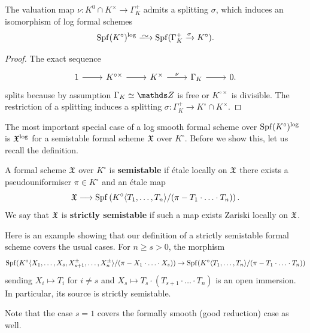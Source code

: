\begin{lem} \label{lem:spf-Kcirc-satisfies364}
    The valuation map $\nu \colon K^0 \cap K^\times \to \Gamma_K^+$ admits a splitting $\sigma$, which induces an isomorphism of log formal schemes
    \[
    \Spf(K^\circ)^{\log} \isomto \Spf(\Gamma_K^+ \xrightarrow{\sigma} K^\circ).
    \]
\end{lem}
\begin{proof} 
    The exact sequence 
    \[
        \begin{tikzcd}
            1 \ar[r] & K^{\circ\times} \ar[r] & K^\times \ar[r,"\nu"] & \Gamma_K\ar[r] & 0.
        \end{tikzcd}
    \]
   splits because by assumption $\Gamma_K \simeq \bZ$ is free or $K^{\circ \times}$ is divisible. The restriction of a splitting induces a splitting $\sigma \colon \Gamma_K^+ \to K^\circ \cap K^\times$. 
\end{proof}


The most important special case of a log smooth formal scheme over $\operatorname{Spf}(K^\circ)^{\rm log}$ is ${\mathfrak{X}}^{\rm log}$ for a semistable formal scheme ${\mathfrak{X}}$ over $K^\circ$. Before we show this, let us recall the definition. 

\begin{defi} \label{def:ss-formal-sch}
    A formal scheme ${\mathfrak{X}}$ over $K^\circ$ is {\bf semistable} if \'etale locally on ${\mathfrak{X}}$ there exists a pseudouniformiser $\pi\in K^\circ$ and an \'etale map
    \[
        {\mathfrak{X}} \longrightarrow \operatorname{Spf}\left( K^\circ\langle T_1,\dots, T_n\rangle/(\pi - T_1\cdot\ldots\cdot T_n) \right).
    \]
    We say that ${\mathfrak{X}}$ is {\bf strictly semistable} if such a map exists Zariski locally on ${\mathfrak{X}}$. 
\end{defi}

\begin{ex} \label{ex:standard-log-structure-Kcirc}
    Here is an example showing that our definition of a strictly semistable formal scheme covers the usual cases. For $n \geq s > 0$, the morphism
    \[
    \operatorname{Spf}(K^\circ\langle X_1,\ldots, X_s, X_{s+1}^\pm, \ldots, X_n^\pm\rangle/(\pi - X_1 \cdot \ldots \cdot X_s)) \to \operatorname{Spf}( K^\circ\langle T_1,\dots, T_n\rangle/(\pi - T_1\cdot\ldots\cdot T_n))
    \]
    sending $X_i \mapsto T_i$ for $i \not= s$ and $X_s \mapsto T_s \cdot(T_{s+1} \cdot \ldots \cdot T_n)$ is an open immersion. In particular, its source is strictly semistable. 

    Note that the case $s=1$ covers the formally smooth (good reduction) case as well.
\end{ex}

